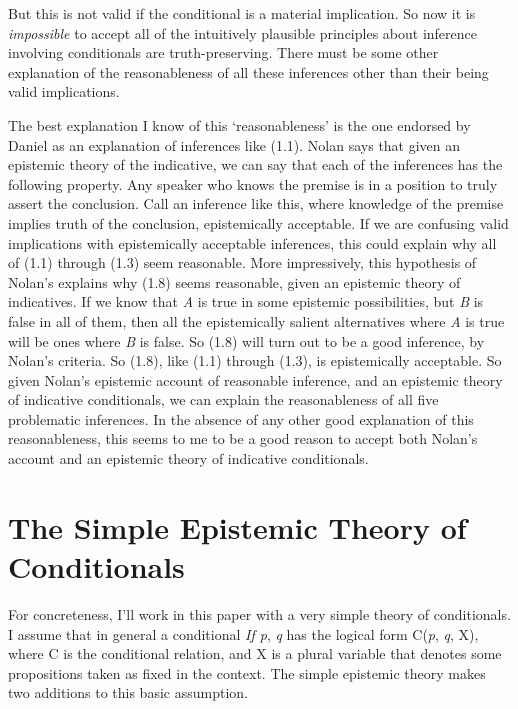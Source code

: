 \noindent But this is not valid if the conditional is a material implication. So now it is \textit{impossible} to accept all of the intuitively plausible principles about inference involving conditionals are truth-preserving. There must be some other explanation of the reasonableness of all these inferences other than their being valid implications.

The best explanation I know of this `reasonableness' is the one endorsed by Daniel \citet{Nolan2003} as an explanation of inferences like (1.1). Nolan says that given an epistemic theory of the indicative, we can say that each of the inferences has the following property. Any speaker who knows the premise is in a position to truly assert the conclusion. Call an inference like this, where knowledge of the premise implies truth of the conclusion, epistemically acceptable. If we are confusing valid implications with epistemically acceptable inferences, this could explain why all of (1.1) through (1.3) seem reasonable. More impressively, this hypothesis of Nolan's explains why (1.8) seems reasonable, given an epistemic theory of indicatives. If we know that \textit{A} is true in some epistemic possibilities, but \textit{B} is false in all of them, then all the epistemically salient alternatives where \textit{A} is true will be ones where \textit{B} is false. So (1.8) will turn out to be a good inference, by Nolan's criteria. So (1.8), like (1.1) through (1.3), is epistemically acceptable. So given Nolan's epistemic account of reasonable inference, and an epistemic theory of indicative conditionals, we can explain the reasonableness of all five problematic inferences. In the absence of any other good explanation of this reasonableness, this seems to me to be a good reason to accept both Nolan's account and an epistemic theory of indicative conditionals.


\section{The Simple Epistemic Theory of Conditionals}

For concreteness, I'll work in this paper with a very simple theory of conditionals. I assume that in general a conditional \textit{If p}, \textit{q} has the logical form C(\textit{p}, \textit{q}, X), where C is the conditional relation, and X is a plural variable that denotes some propositions taken as fixed in the context. The simple epistemic theory makes two additions to this basic assumption.

